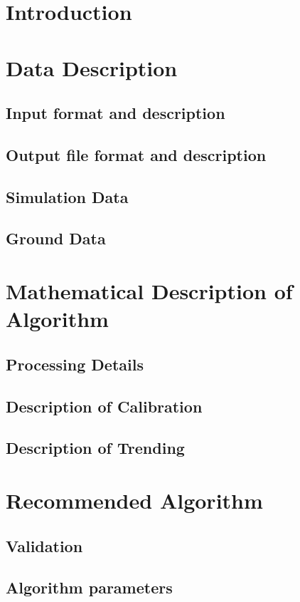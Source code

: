 \documentclass[MS]{spherex}
\author{
  \person[email=stephanie@example.com]{Stephanie Lowe} \\
  \person[email=efren@example.com]{Efren Archer} \\
}
\begin{document}
\maketitle

\section{Introduction}

\section{Data Description}

\subsection{Input format and description}

\subsection{Output file format and description}

\subsection{Simulation Data}

\subsection{Ground Data}

\section{Mathematical Description of Algorithm}

\subsection{Processing Details}

\subsection{Description of Calibration}

\subsection{Description of Trending}

\section{Recommended Algorithm}

\subsection{Validation}

\subsection{Algorithm parameters}


\end{document}
